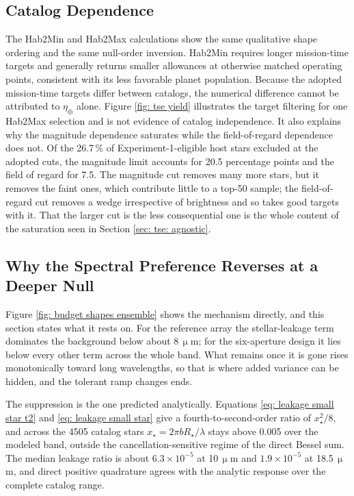\documentclass[12pt,a4paper]{article}
\numberwithin{equation}{section}
\numberwithin{figure}{section}
\numberwithin{table}{section}
\begin{document}
\subsection{Catalog Dependence}
The Hab2Min and Hab2Max calculations show the same qualitative shape ordering and the same null-order inversion. Hab2Min requires longer mission-time targets and generally returns smaller allowances at otherwise matched operating points, consistent with its less favorable planet population. Because the adopted mission-time targets differ between catalogs, the numerical difference cannot be attributed to $\eta_\oplus$ alone. Figure \ref{fig: tse yield} illustrates the target filtering for one Hab2Max selection and is not evidence of catalog independence. It also explains why the magnitude dependence saturates while the field-of-regard dependence does not. Of the 26.7\,\% of Experiment-1-eligible host stars excluded at the adopted cuts, the magnitude limit accounts for 20.5 percentage points and the field of regard for 7.5. The magnitude cut removes many more stars, but it removes the faint ones, which contribute little to a top-50 sample; the field-of-regard cut removes a wedge irrespective of brightness and so takes good targets with it. That the larger cut is the less consequential one is the whole content of the saturation seen in Section \ref{sec: tse: agnostic}.

\subsection{Why the Spectral Preference Reverses at a Deeper Null} \label{sec: tse: null order}
Figure \ref{fig: budget shapes ensemble} shows the mechanism directly, and this section states what it rests on. For the reference array the stellar-leakage term dominates the background below about $8\,\upmu$m; for the six-aperture design it lies below every other term across the whole band. What remains once it is gone rises monotonically toward long wavelengths, so that is where added variance can be hidden, and the tolerant ramp changes ends.

The suppression is the one predicted analytically. Equations \ref{eq: leakage small star t2} and \ref{eq: leakage small star} give a fourth-to-second-order ratio of $x_\star^2/8$, and across the 4505 catalog stars $x_\star=2\pi bR_\star/\lambda$ stays above 0.005 over the modeled band, outside the cancellation-sensitive regime of the direct Bessel sum. The median leakage ratio is about $6.3\times10^{-5}$ at 10\,$\upmu$m and $1.9\times10^{-5}$ at 18.5\,$\upmu$m, and direct positive quadrature agrees with the analytic response over the complete catalog range.
\end{document}
